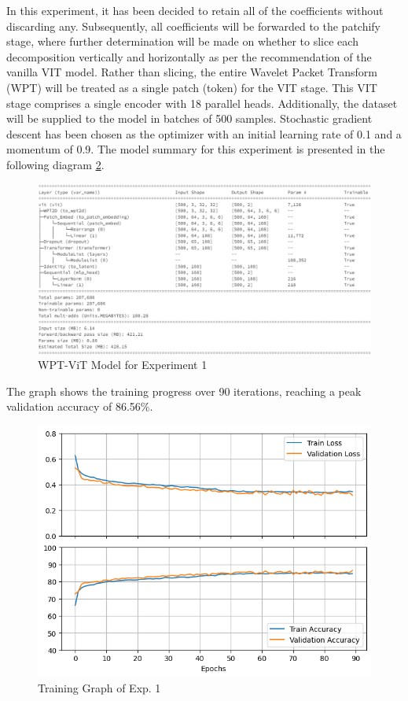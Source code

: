 \documentclass{svproc}
\begin{document}
\noindent
In this experiment, it has been decided to retain all of the coefficients without discarding any. Subsequently, all coefficients will be forwarded to the patchify stage, where further determination will be made on whether to slice each decomposition vertically and horizontally as per the recommendation of the vanilla VIT model. Rather than slicing, the entire Wavelet Packet Transform (WPT) will be treated as a single patch (token) for the VIT stage. This VIT stage comprises a single encoder with 18 parallel heads. Additionally, the dataset will be supplied to the model in batches of 500 samples. Stochastic gradient descent has been chosen as the optimizer with an initial learning rate of 0.1 and a momentum of 0.9. The model summary for this experiment is presented in the following diagram \ref{fig:exp1_model}.

\begin{figure}[H]
  \centering
    \includegraphics[width=1.0\linewidth]{figures/exp1_model.png}
    \caption{WPT-ViT Model for Experiment 1}
    \label{fig:exp1_model}
\end{figure}

\noindent 
The graph shows the training progress over 90 iterations, reaching a peak validation accuracy of 86.56\%.

\begin{figure}[H]
  \centering
    \includegraphics[width=0.6\linewidth]{figures/exp1_traincurve.png}
    \caption{Training Graph of Exp. 1}
    \label{fig:exp1_model}
\end{figure}
\end{document}
